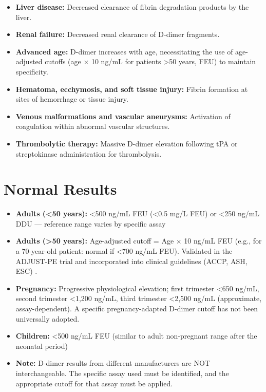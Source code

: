 \begin{itemize}
  \item \textbf{Liver disease:} Decreased clearance of fibrin degradation products by the liver.
  \item \textbf{Renal failure:} Decreased renal clearance of D-dimer fragments.
  \item \textbf{Advanced age:} D-dimer increases with age, necessitating the use of age-adjusted cutoffs (age $\times$ 10 ng/mL for patients >50 years, FEU) to maintain specificity.
  \item \textbf{Hematoma, ecchymosis, and soft tissue injury:} Fibrin formation at sites of hemorrhage or tissue injury.
  \item \textbf{Venous malformations and vascular aneurysms:} Activation of coagulation within abnormal vascular structures.
  \item \textbf{Thrombolytic therapy:} Massive D-dimer elevation following tPA or streptokinase administration for thrombolysis.
\end{itemize}

\section*{Normal Results}
\begin{itemize}
  \item \textbf{Adults (<50 years):} <500 ng/mL FEU (<0.5 mg/L FEU) or <250 ng/mL DDU --- reference range varies by specific assay \cite{wallach2022interpretation}
  \item \textbf{Adults (>50 years):} Age-adjusted cutoff = Age $\times$ 10 ng/mL FEU (e.g., for a 70-year-old patient: normal if <700 ng/mL FEU). Validated in the ADJUST-PE trial and incorporated into clinical guidelines (ACCP, ASH, ESC) \cite{lim2018ash}.
  \item \textbf{Pregnancy:} Progressive physiological elevation; first trimester <650 ng/mL, second trimester <1,200 ng/mL, third trimester <2,500 ng/mL (approximate, assay-dependent). A specific pregnancy-adapted D-dimer cutoff has not been universally adopted.
  \item \textbf{Children:} <500 ng/mL FEU (similar to adult non-pregnant range after the neonatal period)
  \item \textbf{Note:} D-dimer results from different manufacturers are NOT interchangeable. The specific assay used must be identified, and the appropriate cutoff for that assay must be applied.
\end{itemize}

